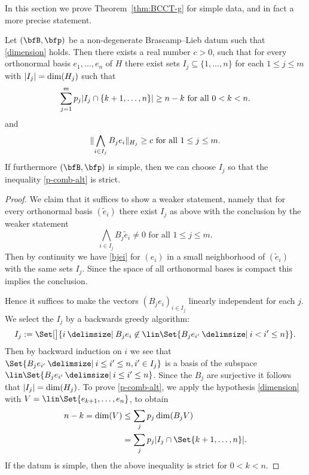 In this section we prove Theorem~\ref{thm:BCCT-g} for simple data, and in fact a more precise statement.

\begin{lemma}\label{babygauss} Let $(\bfB,\p)$ be a non-degenerate Brascamp--Lieb datum such that \eqref{dimension} holds.
Then there exists a real number $c > 0$, such that for every orthonormal basis $e_1,\ldots,e_n$ of $H$ there exist sets $I_j \subseteq \{1,\ldots,n\}$ for each $1 \leq j \leq m$ with $\lvert I_j\rvert = \dim(H_j)$ such that
\begin{equation}\label{p-comb-alt}
\sum_{j=1}^m p_j \lvert I_j \cap \{k+1,\ldots,n\}\rvert \geq n-k \text{ for all } 0 < k < n.
\end{equation}
and
\begin{equation}\label{bjei}
\lVert \bigwedge_{i \in I_j} B_j e_i \rVert_{H_{j}} \geq c \text{ for all } 1 \leq j \leq m.
\end{equation}
If furthermore $(\bfB,\p)$ is simple, then we can choose $I_{j}$ so that the inequality \eqref{p-comb-alt} is strict.
\end{lemma}

\begin{proof}
We claim that it suffices to show a weaker statement, namely that for every orthonormal basis $(\tilde{e}_{i})$ there exist $I_{j}$ as above with
the conclusion by the weaker statement
\[
\bigwedge_{i \in I_j} B_j \tilde{e}_i \neq 0 \text{ for all } 1 \leq j \leq m.
\]
Then by continuity we have \eqref{bjei} for $(e_{i})$ in a small neighborhood of $(\tilde{e}_{i})$ with the same sets $I_{j}$.
Since the space of all orthonormal bases is compact this implies the conclusion.

Hence it suffices to make the vectors $(B_j e_i)_{i \in I_j}$ linearly independent for each $j$.
We select the $I_j$ by a backwards greedy algorithm:
\[
I_{j} :=
\Set[\big]{ i \given B_{j}e_{i} \not\in \lin \Set{ B_j e_{i'} \given i < i' \leq n } }.
\]
Then by backward induction on $i$ we see that $\Set{ B_j e_{i'} \given i \leq i' \leq n, i' \in I_{j} }$ is a basis of the subspace $\lin \Set{ B_j e_{i'} \given i \leq i' \leq n }$.
Since the $B_j$ are surjective it follows that $\lvert I_j\rvert = \dim(H_j)$.
To prove \eqref{p-comb-alt}, we apply the hypothesis
\eqref{dimension} with $V = \lin \Set{ e_{k+1},\dotsc,e_n }$, to obtain
\begin{align*}
n-k = \dim(V)
&\leq
\sum_j p_j \dim(B_j V)
\\ &=
\sum_j p_j \abs{I_j \cap \Set{k+1,\dotsc,n}}.
\end{align*}
If the datum is simple, then the above inequality is strict for $0 < k < n$.
\end{proof}

